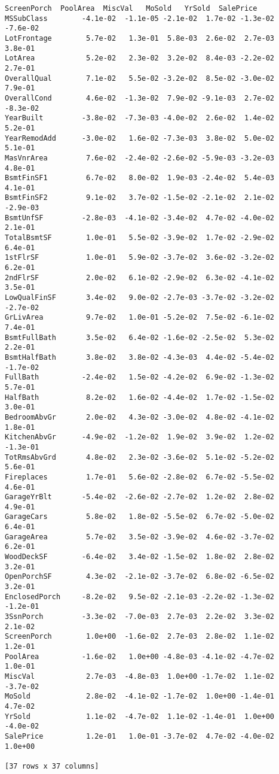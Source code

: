 \documentclass[11pt]{article}
\begin{document}
\begin{Verbatim}[commandchars=\\\{\}]
               ScreenPorch  PoolArea  MiscVal   MoSold   YrSold  SalePrice  
MSSubClass        -4.1e-02  -1.1e-05 -2.1e-02  1.7e-02 -1.3e-02   -7.6e-02  
LotFrontage        5.7e-02   1.3e-01  5.8e-03  2.6e-02  2.7e-03    3.8e-01  
LotArea            5.2e-02   2.3e-02  3.2e-02  8.4e-03 -2.2e-02    2.7e-01  
OverallQual        7.1e-02   5.5e-02 -3.2e-02  8.5e-02 -3.0e-02    7.9e-01  
OverallCond        4.6e-02  -1.3e-02  7.9e-02 -9.1e-03  2.7e-02   -8.3e-02  
YearBuilt         -3.8e-02  -7.3e-03 -4.0e-02  2.6e-02  1.4e-02    5.2e-01  
YearRemodAdd      -3.0e-02   1.6e-02 -7.3e-03  3.8e-02  5.0e-02    5.1e-01  
MasVnrArea         7.6e-02  -2.4e-02 -2.6e-02 -5.9e-03 -3.2e-03    4.8e-01  
BsmtFinSF1         6.7e-02   8.0e-02  1.9e-03 -2.4e-02  5.4e-03    4.1e-01  
BsmtFinSF2         9.1e-02   3.7e-02 -1.5e-02 -2.1e-02  2.1e-02   -2.9e-03  
BsmtUnfSF         -2.8e-03  -4.1e-02 -3.4e-02  4.7e-02 -4.0e-02    2.1e-01  
TotalBsmtSF        1.0e-01   5.5e-02 -3.9e-02  1.7e-02 -2.9e-02    6.4e-01  
1stFlrSF           1.0e-01   5.9e-02 -3.7e-02  3.6e-02 -3.2e-02    6.2e-01  
2ndFlrSF           2.0e-02   6.1e-02 -2.9e-02  6.3e-02 -4.1e-02    3.5e-01  
LowQualFinSF       3.4e-02   9.0e-02 -2.7e-03 -3.7e-02 -3.2e-02   -2.7e-02  
GrLivArea          9.7e-02   1.0e-01 -5.2e-02  7.5e-02 -6.1e-02    7.4e-01  
BsmtFullBath       3.5e-02   6.4e-02 -1.6e-02 -2.5e-02  5.3e-02    2.2e-01  
BsmtHalfBath       3.8e-02   3.8e-02 -4.3e-03  4.4e-02 -5.4e-02   -1.7e-02  
FullBath          -2.4e-02   1.5e-02 -4.2e-02  6.9e-02 -1.3e-02    5.7e-01  
HalfBath           8.2e-02   1.6e-02 -4.4e-02  1.7e-02 -1.5e-02    3.0e-01  
BedroomAbvGr       2.0e-02   4.3e-02 -3.0e-02  4.8e-02 -4.1e-02    1.8e-01  
KitchenAbvGr      -4.9e-02  -1.2e-02  1.9e-02  3.9e-02  1.2e-02   -1.3e-01  
TotRmsAbvGrd       4.8e-02   2.3e-02 -3.6e-02  5.1e-02 -5.2e-02    5.6e-01  
Fireplaces         1.7e-01   5.6e-02 -2.8e-02  6.7e-02 -5.5e-02    4.6e-01  
GarageYrBlt       -5.4e-02  -2.6e-02 -2.7e-02  1.2e-02  2.8e-02    4.9e-01  
GarageCars         5.8e-02   1.8e-02 -5.5e-02  6.7e-02 -5.0e-02    6.4e-01  
GarageArea         5.7e-02   3.5e-02 -3.9e-02  4.6e-02 -3.7e-02    6.2e-01  
WoodDeckSF        -6.4e-02   3.4e-02 -1.5e-02  1.8e-02  2.8e-02    3.2e-01  
OpenPorchSF        4.3e-02  -2.1e-02 -3.7e-02  6.8e-02 -6.5e-02    3.2e-01  
EnclosedPorch     -8.2e-02   9.5e-02 -2.1e-03 -2.2e-02 -1.3e-02   -1.2e-01  
3SsnPorch         -3.3e-02  -7.0e-03  2.7e-03  2.2e-02  3.3e-02    2.1e-02  
ScreenPorch        1.0e+00  -1.6e-02  2.7e-03  2.8e-02  1.1e-02    1.2e-01  
PoolArea          -1.6e-02   1.0e+00 -4.8e-03 -4.1e-02 -4.7e-02    1.0e-01  
MiscVal            2.7e-03  -4.8e-03  1.0e+00 -1.7e-02  1.1e-02   -3.7e-02  
MoSold             2.8e-02  -4.1e-02 -1.7e-02  1.0e+00 -1.4e-01    4.7e-02  
YrSold             1.1e-02  -4.7e-02  1.1e-02 -1.4e-01  1.0e+00   -4.0e-02  
SalePrice          1.2e-01   1.0e-01 -3.7e-02  4.7e-02 -4.0e-02    1.0e+00  

[37 rows x 37 columns]

    \end{Verbatim}
\end{document}
